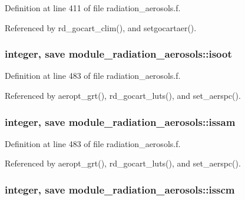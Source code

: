 Definition at line 411 of file radiation\+\_\+aerosols.\+f.



Referenced by rd\+\_\+gocart\+\_\+clim(), and setgocartaer().

\subsubsection[{\texorpdfstring{isoot}{isoot}}]{\setlength{\rightskip}{0pt plus 5cm}integer, save module\+\_\+radiation\+\_\+aerosols\+::isoot\hspace{0.3cm}{\ttfamily [private]}}\hypertarget{group__module__radiation__aerosols_gaa9aa876f65d1e1e971607bff4ffbddad}{}\label{group__module__radiation__aerosols_gaa9aa876f65d1e1e971607bff4ffbddad}


Definition at line 483 of file radiation\+\_\+aerosols.\+f.



Referenced by aeropt\+\_\+grt(), rd\+\_\+gocart\+\_\+luts(), and set\+\_\+aerspc().

\subsubsection[{\texorpdfstring{issam}{issam}}]{\setlength{\rightskip}{0pt plus 5cm}integer, save module\+\_\+radiation\+\_\+aerosols\+::issam\hspace{0.3cm}{\ttfamily [private]}}\hypertarget{group__module__radiation__aerosols_gab64435256571a80bbb577fc4f27b39ee}{}\label{group__module__radiation__aerosols_gab64435256571a80bbb577fc4f27b39ee}


Definition at line 483 of file radiation\+\_\+aerosols.\+f.



Referenced by aeropt\+\_\+grt(), rd\+\_\+gocart\+\_\+luts(), and set\+\_\+aerspc().

\subsubsection[{\texorpdfstring{isscm}{isscm}}]{\setlength{\rightskip}{0pt plus 5cm}integer, save module\+\_\+radiation\+\_\+aerosols\+::isscm\hspace{0.3cm}{\ttfamily [private]}}\hypertarget{group__module__radiation__aerosols_ga762cff73e22fefab8adf68d08d5c4df1}{}\label{group__module__radiation__aerosols_ga762cff73e22fefab8adf68d08d5c4df1}


